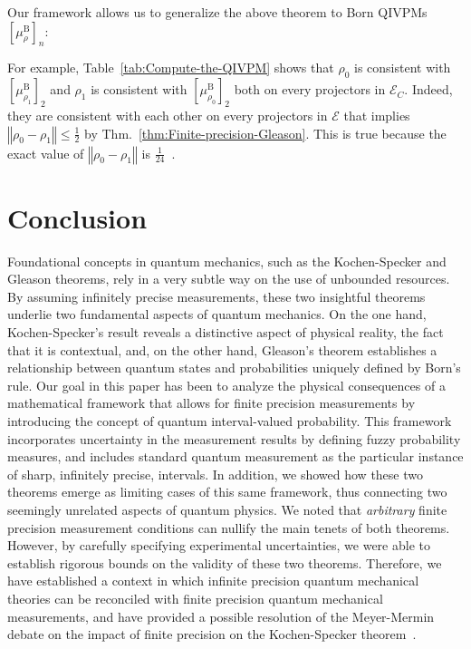 \documentclass[english,reprint, aps, prl,superscriptaddress, showpacs,
showkeys, longbibliography, amsmath, amssymb, floatfix]{revtex4-1}
\theoremstyle{plain}
\theoremstyle{definition}
\newcommand{\events}{\ensuremath{\mathcal{E}}}
\begin{document}
Our framework allows us to generalize the above theorem to Born QIVPMs~$\left[\mu_{\rho}^{\mathrm{B}}\right]_{n}$: 

\noindent For example, Table~\ref{tab:Compute-the-QIVPM} shows that
$\rho_{0}$ is consistent with $\left[\mu_{\rho_{1}}^{\mathrm{B}}\right]_{2}$
and $\rho_{1}$ is consistent with $\left[\mu_{\rho_{0}}^{\mathrm{B}}\right]_{2}$
both on every projectors in $\events_{C}$. Indeed, they are consistent
with each other on every projectors in $\events$ that implies $\left\Vert \rho_{0}-\rho_{1}\right\Vert \le\frac{1}{2}$
by Thm.~\ref{thm:Finite-precision-Gleason}. This is true because
the exact value of $\left\Vert \rho_{0}-\rho_{1}\right\Vert $ is
$\frac{1}{24}$~\citep{544199}.

\section{Conclusion}
\label{sec:Conclusion}
  
Foundational concepts in quantum mechanics, such as the Kochen-Specker
and Gleason theorems, rely in a very subtle way on the use of
unbounded resources. By assuming infinitely precise measurements,
these two insightful theorems underlie two fundamental aspects of
quantum mechanics. On the one hand, Kochen-Specker's result reveals a
distinctive aspect of physical reality, the fact that it is
contextual, and, on the other hand, Gleason's theorem establishes a
relationship between quantum states and probabilities uniquely defined
by Born's rule.  Our goal in this paper has been to analyze the
physical consequences of a mathematical framework that allows for
finite precision measurements by introducing the concept of quantum
interval-valued probability. This framework incorporates uncertainty
in the measurement results by defining fuzzy probability measures, and
includes standard quantum measurement as the particular instance of
sharp, infinitely precise, intervals.  In addition, we showed how
these two theorems emerge as limiting cases of this same framework,
thus connecting two seemingly unrelated aspects of quantum physics. We
noted that {\it arbitrary\/} finite precision measurement conditions
can nullify the main tenets of both theorems. However, by carefully
specifying experimental uncertainties, we were able to establish
rigorous bounds on the validity of these two theorems. Therefore, we
have established a context in which infinite precision quantum
mechanical theories can be reconciled with finite precision quantum
mechanical measurements, and have provided a possible resolution of
the Meyer-Mermin debate on the impact of finite precision on the
Kochen-Specker theorem~\cite{PhysRevLett.83.3751,Mermin1999}.



\end{document}
